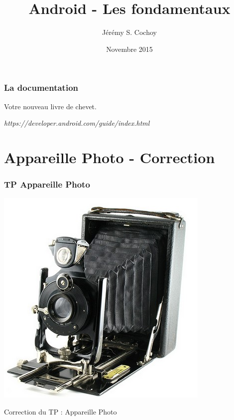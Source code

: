 \documentclass{beamer}
\begin{document}
\title{Android - Les fondamentaux}
\author{Jérémy S. Cochoy}
\date{Novembre 2015}


\begin{frame}
\titlepage
\end{frame}

\begin{frame}
\tableofcontents
\end{frame}

\begin{frame}
\frametitle{La documentation}

\begin{block}{Votre nouveau livre de chevet.}
\begin{center}
\emph{https://developer.android.com/guide/index.html}
\end{center}
\end{block}

\end{frame}

\section{Appareille Photo - Correction}

\begin{frame}
\frametitle{TP Appareille Photo}
\begin{center}
\includegraphics[scale=0.4]{appareil-photo-vintage.jpg}
\end{center}
\begin{block}{}
\begin{center}
Correction du TP : Appareille Photo
\end{center}
\end{block}
\end{frame}
\end{document}
